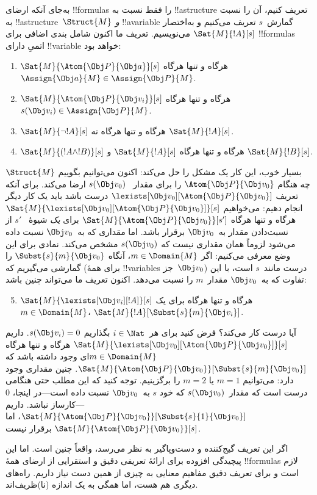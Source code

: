 \documentclass[../../../include/open-logic-section]{subfiles}
\begin{document}
به‌جای آنکه ارضای !!{formula}s را فقط نسبت به !!a{structure} تعریف
کنیم، آن را نسبت به !!a{structure}~$\Struct{M}$ \emph{و}
!!a{variable} گمارش~$s$ تعریف می‌کنیم و به‌اختصار
$\Sat{M}{!A}[s]$ می‌نویسیم. تعریف ما اکنون شامل بندی اضافی برای
!!{formula}s اتمیِ دارای !!{variable} خواهد بود:
\begin{enumerate}
  \item $\Sat{M}{\Atom{\Obj P}{\Obj a}}[s]$ هرگاه و تنها هرگاه
  $\Assign{\Obj a}{M} \in \Assign{\Obj P}{M}$.
  \item $\Sat{M}{\Atom{\Obj P}{\Obj v_i}}[s]$ هرگاه و تنها هرگاه
  $s(\Obj v_i) \in \Assign{\Obj P}{M}$.
  \item $\Sat{M}{\lnot !A}[s]$ هرگاه و تنها هرگاه نه
  $\Sat{M}{!A}[s]$.
  \item $\Sat{M}{(!A \land !B)}[s]$ هرگاه و تنها هرگاه
  $\Sat{M}{!A}[s]$ و $\Sat{M}{!B}[s]$.
\end{enumerate}
بسیار خوب، این کار یک مشکل را حل می‌کند: اکنون می‌توانیم بگوییم
$\Struct{M}$ چه هنگام $\Atom{\Obj P}{\Obj v_0}$ را برای مقدار
~$s(\Obj v_0)$ ارضا می‌کند. برای آنکه تعریف
$\lexists[\Obj v_0][\Atom{\Obj P}{\Obj v_0}]$ درست باشد باید یک کار
دیگر انجام دهیم: می‌خواهیم
$\Sat{M}{\lexists[\Obj v_0][\Atom{\Obj P}{\Obj v_0}]}[s]$ هرگاه و تنها
هرگاه $\Sat{M}{\Atom{\Obj P}{\Obj v_0}}[s']$ برای \emph{یک} شیوهٔ
~$s'$ از نسبت‌دادن مقدار به~$\Obj v_0$ برقرار باشد. اما مقداری که به~$\Obj v_0$
نسبت داده می‌شود لزوماً همان مقداری نیست که $s(\Obj v_0)$ مشخص
می‌کند. نمادی برای این وضع معرفی می‌کنیم: اگر $m \in \Domain{M}$،
آنگاه $\Subst{s}{m}{\Obj v_0}$ را گمارشی می‌گیریم که (برای همهٔ
!!{variable}s جز~$\Obj v_0$) درست مانند~$s$ است، با این تفاوت که
به~$\Obj v_0$ مقدار~$m$ را نسبت می‌دهد. اکنون تعریف ما می‌تواند چنین
باشد:
\begin{enumerate}\setcounter{enumi}{4}
  \item $\Sat{M}{\lexists[\Obj v_i][!A]}[s]$ هرگاه و تنها هرگاه برای
  یک~$m \in \Domain{M}$، $\Sat{M}{!A}[\Subst{s}{m}{\Obj v_i}]$.
\end{enumerate}
آیا درست کار می‌کند؟ فرض کنید برای هر~$i \in \Nat$ بگذاریم
$s(\Obj v_i) = 0$. داریم
$\Sat{M}{\lexists[\Obj v_0][\Atom{\Obj P}{\Obj v_0}]}[s]$ هرگاه و تنها
هرگاه $m \in \Domain{M}$ای وجود داشته باشد که
$\Sat{M}{\Atom{\Obj P}{\Obj v_0}}[\Subst{s}{m}{\Obj v_0}]$. چنین
مقداری وجود دارد: می‌توانیم $m = 1$ یا $m = 2$ را برگزینیم. توجه کنید
که این مطلب حتی هنگامی درست است که مقدار~$s(\Obj v_0)$ که خود $s$
به~$\Obj v_0$ نسبت داده است---در اینجا، $0$---کارساز نباشد. داریم
$\Sat{M}{\Atom{\Obj P}{\Obj v_0}}[\Subst{s}{1}{\Obj v_0}]$، اما
$\Sat{M}{\Atom{\Obj P}{\Obj v_0}}[s]$ برقرار نیست.

اگر این تعریف گیج‌کننده و دست‌وپاگیر به نظر می‌رسد، واقعاً چنین است.
اما این پیچیدگی افزوده برای ارائهٔ تعریفی دقیق و استقرایی از ارضای همهٔ
!!{formula}s لازم است و برای تعریف دقیق مفاهیم معنایی به چیزی از همین
دست نیاز داریم. راه‌های دیگری هم هست، اما همگی به یک اندازه
(نا)ظریف‌اند.
\end{document}
